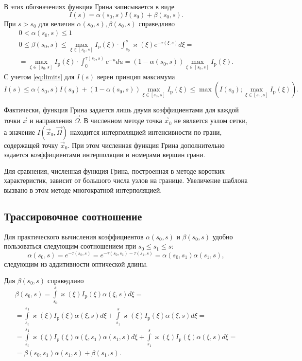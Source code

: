В этих обозначениях функция Грина записывается в виде
\begin{equation}
I(s) = \alpha(s_0, s) I(s_0) + \beta(s_0, s).
\label{eq:connection}
\end{equation}
При $s > s_0$ для величин $\alpha(s_0, s), \beta(s_0, s)$ справедливо
\begin{equation}
\begin{gathered}
0 < \alpha(s_0, s) \leqslant 1\\
0 \leqslant \beta(s_0, s) \leqslant \max_{\xi \in [s_0, s]} I_\text{p}(\xi)
\cdot \int_{s_0}^s \varkappa(\xi) e^{-\tau(\xi, s)} d\xi = \\ =
\max_{\xi \in [s_0, s]} I_\text{p}(\xi)
\cdot \int_{0}^{\tau(s_0,s)} e^{-u} du =
(1 - \alpha(s_0, s))\max_{\xi \in [s_0, s]} I_\text{p}(\xi).
\end{gathered}
\label{eq:limits}
\end{equation}
С учетом \eqref{eq:limits} для $I(s)$ верен принцип максимума
\[
I(s) \leqslant \alpha(s_0, s) I(s_0) + (1 - \alpha(s_0, s))\max_{\xi \in [s_0, s]} I_\text{p}(\xi) \leqslant \max\left(I(s_0); \max_{\xi \in [s_0, s]} I_\text{p}(\xi)\right).
\]

Фактически, функция Грина задается лишь двумя коэффициентами для каждой точки $\vec x$ и направления $\vec \Omega$. В численном методе точка $\vec x_0$ не является узлом сетки, а значение $I(\vec x_0, \vec \Omega)$ находится интерполяцией интенсивности по грани, содержащей точку $\vec x_0$. При этом численная функция Грина дополнительно задается коэффициентами интерполяции и номерами вершин грани.

Для сравнения, численная функция Грина, построенная в методе коротких характеристик, зависит от большого числа узлов на границе. Увеличение шаблона вызвано в этом методе многократной интерполяцией.

\subsection{Трассировочное соотношение}

Для практического вычисления коэффициентов $\alpha(s_0, s)$ и $\beta(s_0, s)$ удобно пользоваться следующим соотношением при $s_0 \leq s_1 \leq s$:
\[
\alpha(s_0, s) = e^{-\tau(s_0, s)} = 
e^{-\tau(s_0, s_1) -\tau(s_1, s)} = 
\alpha(s_0, s_1)\alpha(s_1, s),
\]
следующим из аддитивности оптической длины.

Для $\beta(s_0, s)$ справедливо
\begin{multline*}
\beta(s_0, s) = 
\int\limits_{s_0}^s \varkappa(\xi) I_\text{p}(\xi) \alpha(\xi, s) d\xi = \\ =
\int\limits_{s_0}^{s_1} \varkappa(\xi) I_\text{p}(\xi) \alpha(\xi, s) d\xi +
\int\limits_{s_1}^s \varkappa(\xi) I_\text{p}(\xi) \alpha(\xi, s) d\xi = \\ =
\int\limits_{s_0}^{s_1} \varkappa(\xi) I_\text{p}(\xi) \alpha(\xi, s_1) \alpha(s_1, s) d\xi +
\int\limits_{s_1}^s \varkappa(\xi) I_\text{p}(\xi) \alpha(\xi, s) d\xi = \\
= \beta(s_0, s_1) \alpha(s_1, s) + \beta(s_1, s).
\end{multline*}

